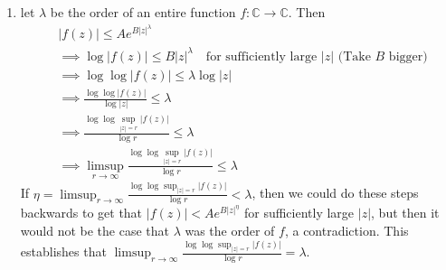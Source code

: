 \documentclass[12pt]{article}
\def\mbb#1{\mathbb{#1}}
\def \C{\mbb{C}}
\def \R{\mbb{R}}
\theoremstyle{definition}
\theoremstyle{remark}
\begin{document}
\begin{enumerate}[leftmargin=\labelsep]
	\begin{align*}
		\sum_{i=1}^\infty -\log|z_i|
	\end{align*}
	is a positive termed series. Also, $1-|z_i| > 0$ as well, and hence
	\begin{align*}
		\sum_{i=1}^\infty 1-|z_i|
	\end{align*}
	is another positive termed series. Now, defined a new function
	\begin{align*}
		f(x) = \begin{cases}
			\frac{-\log(x)}{1-x}, \; x > 0, \; x \neq 1 \\
			1, \; x = 1
		\end{cases}
	\end{align*}
	The limit calculation we did above shows this function is continuous on $\R_{>0}$. Consider the limit
	\begin{align*}
		\lim_{i \to \infty} \frac{-\log(|z_i|)}{1-|z_i|} = \lim_{i \to \infty} f(|z_i|) = f(\lim_{i \to \infty} |z_i|) = f(1) = 1
	\end{align*}
	We may now apply the limit comparison test to conclude that
	\begin{align*}
		\sum_{i=1}^\infty 1-|z_i|
	\end{align*}
	also converges. $\hfill$ \textbf{Q.E.D.}
	
	
	\item let $\lambda$ be the order of an entire function $f: \C \to \C$. Then
	\begin{align*}
		&|f(z)| \leq Ae^{B|z|^\lambda} \\
		&\implies \log|f(z)| \leq B|z|^\lambda \quad \text{for sufficiently large $|z|$ (Take $B$ bigger)} \\
		&\implies \log \log |f(z)| \leq \lambda \log|z| \\
		&\implies \frac{\log \log |f(z)|}{\log|z|} \leq \lambda \\
		&\implies \frac{\log \log \sup_{|z| = r} |f(z)|}{\log r} \leq \lambda \\
		&\implies \limsup_{r \to \infty} \frac{\log \log \sup_{|z| = r} |f(z)|}{\log r} \leq \lambda
	\end{align*}
	If $\eta = \limsup_{r \to \infty} \frac{\log \log \sup_{|z| = r} |f(z)|}{\log r} < \lambda$, then we could do these steps backwards to get that $|f(z)| < Ae^{B|z|^\eta}$ for sufficiently large $|z|$, but then it would not be the case that $\lambda$ was the order of $f$, a contradiction. This establishes that $\limsup_{r \to \infty} \frac{\log \log \sup_{|z| = r} |f(z)|}{\log r} = \lambda$.
	

\end{enumerate}
\end{document}
